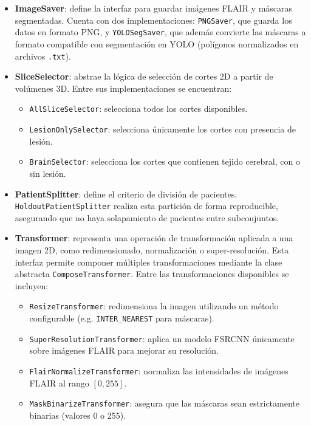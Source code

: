 \documentclass[../main.tex]{subfiles}
\begin{document}
\begin{itemize}
    \item \textbf{ImageSaver}: define la interfaz para guardar imágenes FLAIR y máscaras segmentadas. Cuenta con dos implementaciones: \texttt{PNGSaver}, que guarda los datos en formato PNG, y \texttt{YOLOSegSaver}, que además convierte las máscaras a formato compatible con segmentación en YOLO (polígonos normalizados en archivos \texttt{.txt}).

    \item \textbf{SliceSelector}: abstrae la lógica de selección de cortes 2D a partir de volúmenes 3D. Entre sus implementaciones se encuentran:
    \begin{itemize}
        \item \texttt{AllSliceSelector}: selecciona todos los cortes disponibles.
        \item \texttt{LesionOnlySelector}: selecciona únicamente los cortes con presencia de lesión.
        \item \texttt{BrainSelector}: selecciona los cortes que contienen tejido cerebral, con o sin lesión.
    \end{itemize}

    \item \textbf{PatientSplitter}: define el criterio de división de pacientes. \texttt{HoldoutPatientSplitter} realiza esta partición de forma reproducible, asegurando que no haya solapamiento de pacientes entre subconjuntos.

    \item \textbf{Transformer}: representa una operación de transformación aplicada a una imagen 2D, como redimensionado, normalización o super-resolución. Esta interfaz permite componer múltiples transformaciones mediante la clase abstracta \texttt{ComposeTransformer}. Entre las transformaciones disponibles se incluyen:
    \begin{itemize}
        \item \texttt{ResizeTransformer}: redimensiona la imagen utilizando un método configurable (e.g. \texttt{INTER\_NEAREST} para máscaras).
        \item \texttt{SuperResolutionTransformer}: aplica un modelo FSRCNN únicamente sobre imágenes FLAIR para mejorar su resolución.
        \item \texttt{FlairNormalizeTransformer}: normaliza las intensidades de imágenes FLAIR al rango $[0, 255]$.
        \item \texttt{MaskBinarizeTransformer}: asegura que las máscaras sean estrictamente binarias (valores 0 o 255).
    \end{itemize}
\end{itemize}
\end{document}

